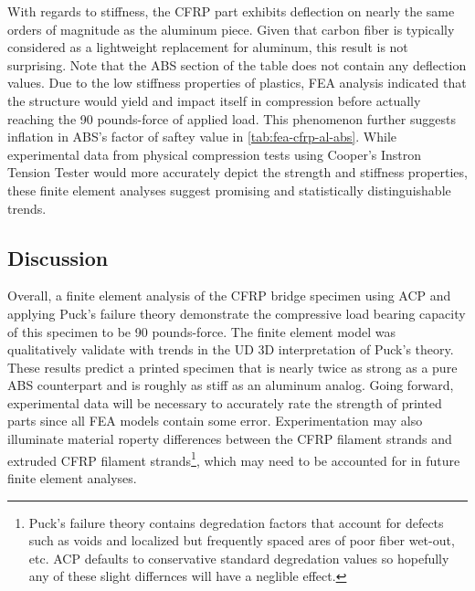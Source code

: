 With regards to stiffness, the CFRP part exhibits deflection on nearly the same orders of magnitude as the aluminum piece. Given that carbon fiber is typically considered as a lightweight replacement for aluminum, this result is not surprising. Note that the ABS section of the table does not contain any deflection values. Due to the low stiffness properties of plastics, FEA analysis indicated that the structure would yield and impact itself in compression before actually reaching the 90 pounds-force of applied load. This phenomenon further suggests inflation in ABS's factor of saftey value in \ref{tab:fea-cfrp-al-abs}. While experimental data from physical compression tests using Cooper's Instron Tension Tester would more accurately depict the strength and stiffness properties, these finite element analyses suggest promising and statistically distinguishable trends.

\subsection{Discussion}

\indent

Overall, a finite element analysis of the CFRP bridge specimen using ACP and applying Puck's failure theory demonstrate the compressive load bearing capacity of this specimen to be 90 pounds-force. The finite element model was qualitatively validate with trends in the UD 3D interpretation of Puck's theory. These results predict a printed specimen that is nearly twice as strong as a pure ABS counterpart and is roughly as stiff as an aluminum analog. Going forward, experimental data will be necessary to accurately rate the strength of printed parts since all FEA models contain some error. Experimentation may also illuminate material roperty differences between the CFRP filament strands and extruded CFRP filament strands\footnote{Puck's failure theory contains degredation factors that account for defects such as voids and localized but frequently spaced ares of poor fiber wet-out, etc. ACP defaults to conservative standard degredation values so hopefully any of these slight differnces will have a neglible effect.}, which may need to be accounted for in future finite element analyses.

\clearpage

